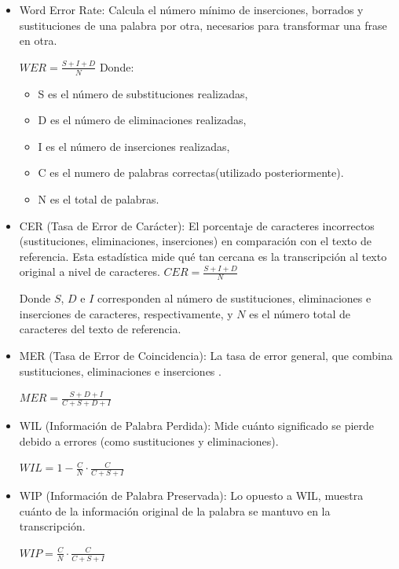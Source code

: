 \begin{itemize}
    \item Word Error Rate: Calcula el número mínimo de inserciones, borrados y sustituciones de una palabra por otra, necesarios para transformar una frase en otra. \cite{ASR_Accuracy} 
\medskip

$\mathit{WER} = \frac{S + I + D}{N}$
Donde:
\begin{itemize}
\item S es el número de substituciones realizadas,
\item D es el número de eliminaciones realizadas,
\item I es el número de inserciones realizadas,
\item C es el numero de palabras correctas(utilizado posteriormente).
\item N es el total de palabras.
\end{itemize}


\item CER (Tasa de Error de Carácter): El porcentaje de caracteres incorrectos (sustituciones, eliminaciones, inserciones) en comparación con el texto de referencia. Esta estadística mide qué tan cercana es la transcripción al texto original a nivel de caracteres.
\medskip
$\mathit{CER}=\frac{S+I+D}{N}$

Donde $S$, $D$ e $I$ corresponden al número de sustituciones, eliminaciones e inserciones de caracteres, respectivamente, y $N$ es el número total de caracteres del texto de referencia.

\item MER (Tasa de Error de Coincidencia): La tasa de error general, que combina sustituciones, eliminaciones e inserciones \cite{Morris2004}.

\medskip

$\mathit{MER}=\frac{S+D+I}{C+S+D+I}$

\item WIL (Información de Palabra Perdida): Mide cuánto significado se pierde debido a errores (como sustituciones y eliminaciones).

\medskip

$\mathit{WIL}=1-\frac{C}{N}\cdot\frac{C}{C+S+I}$

\item WIP (Información de Palabra Preservada): Lo opuesto a WIL, muestra cuánto de la información original de la palabra se mantuvo en la transcripción.

\medskip

$\mathit{WIP}=\frac{C}{N}\cdot\frac{C}{C+S+I}$

\end{itemize}

